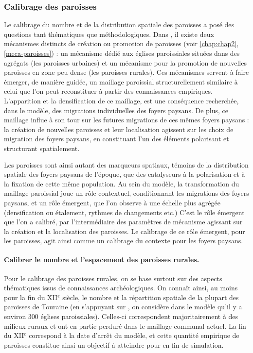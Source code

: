 \subsubsection{Calibrage des paroisses}

Le calibrage du nombre et de la distribution spatiale des paroisses a posé des questions tant thématiques que méthodologiques.
Dans \simfeodal{}, il existe deux mécanismes distincts de création ou promotion de paroisses (voir \cref{chap:chap2}, \cref{meca-paroisses}) :
	un mécanisme dédié aux églises paroissiales situées dans des agrégats (les paroisses \og urbaines\fg{}) et un mécanisme pour la promotion de nouvelles paroisses en zone peu dense (les paroisses \og rurales\fg{}).
Ces mécanismes servent à faire émerger, de manière guidée, un maillage paroissial structurellement similaire à celui que l'on peut reconstituer à partir des connaissances empiriques.
L'apparition et la densification de ce maillage, est une conséquence recherchée, dans le modèle, des migrations individuelles des foyers paysans.
De plus, ce maillage influe à son tour sur les futures migrations de ces mêmes foyers paysans : la création de nouvelles paroisses et leur localisation agissent sur les choix de migration des foyers paysans, en constituant l'un des éléments polarisant et structurant spatialement.

Les paroisses sont ainsi autant des marqueurs spatiaux, témoins de la distribution spatiale des foyers paysans de l'époque, que des catalyseurs à la polarisation et à la fixation de cette même population.
Au sein du modèle, la transformation du maillage paroissial joue un rôle contextuel, conditionnant les migrations des foyers paysans, et un rôle émergent, que l'on observe à une échelle plus agrégée (densification ou étalement, rythmes de changements etc.)
C'est le rôle émergent que l'on a calibré, par l'intermédiaire des paramètres de mécanisme agissant sur la création et la localisation des paroisses.
Le calibrage de ce rôle émergent, pour les paroisses, agit ainsi comme un calibrage du contexte pour les foyers paysans.

\paragraph{Calibrer le nombre et l'espacement des paroisses \og rurales\fg{}.}

Pour le calibrage des paroisses \og rurales\fg{}, on se base surtout sur des aspects thématiques issus de connaissances archéologiques.
On connaît ainsi, au moins pour la fin du XII$^e$ siècle, le nombre et la répartition spatiale de la plupart des paroisses de Touraine (en s'appuyant sur \textcite[31]{zadora-rio_paroisses_2008}, on considère dans le modèle qu'il y a environ 300 églises paroissiales).
Celles-ci correspondent majoritairement à des milieux ruraux et ont en partie perduré dans le maillage communal actuel.
La fin du XII$^e$ correspond à la date d'arrêt du modèle, et cette quantité empirique de paroisses constitue ainsi un objectif à atteindre pour \simfeodal{} en fin de simulation.

